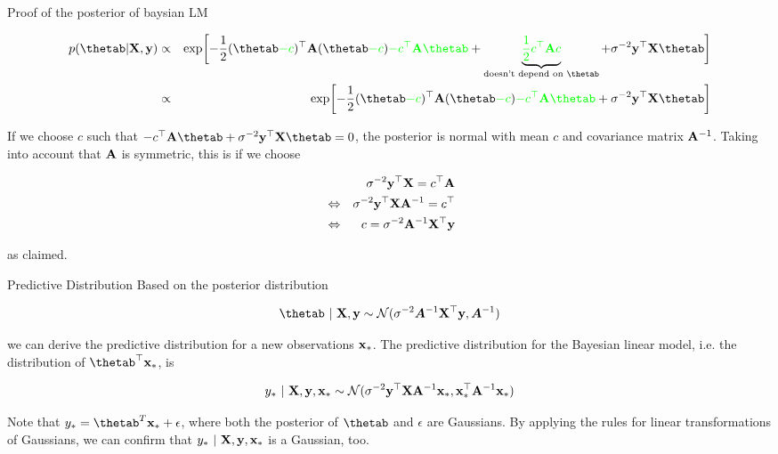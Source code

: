 \documentclass[11pt,compress,t,notes=noshow, xcolor=table]{beamer}
\begin{document}
\begin{vbframe}{Proof of the posterior of baysian LM}
\begin{footnotesize}
    \begin{eqnarray*}
    	p(\thetab | \Xmat, \yv) &\propto&  \exp\biggl[-\frac{1}{2}(\thetab \textcolor{green}{- c})^\top\Amat  (\thetab \textcolor{green}{- c}) \textcolor{green}{- c^\top \Amat \thetab} + \underbrace{\textcolor{green}{\frac{1}{2}c^\top\Amat c}}_{\text{doesn't depend on } \thetab} +\sigma^{-2} \yv^\top \Xmat \thetab\biggr] \\
    	&\propto& \exp\biggl[-\frac{1}{2}(\thetab \textcolor{green}{- c})^\top\Amat  (\thetab \textcolor{green}{- c}) \textcolor{green}{- c^\top \Amat \thetab} +\sigma^{-2} \yv^\top \Xmat \thetab\biggr]
    \end{eqnarray*}
    
    If we choose $c$ such that $- c^\top \Amat \thetab +\sigma^{-2} \yv^\top \Xmat \thetab = 0$, the posterior is normal with mean $c$ and covariance matrix $\mathbf{A}^{-1}$. Taking into account that $\mathbf{A}$ is symmetric, this is if we choose
    
    \begin{eqnarray*}
    && \sigma^{-2} \mathbf{y}^\top \mathbf{X} = c^\top\mathbf{A} \\
    &\Leftrightarrow & \sigma^{-2} \mathbf{y}^\top \mathbf{X} \mathbf{A}^{-1} = c^\top \\
    &\Leftrightarrow& c = \sigma^{-2} \mathbf{A}^{-1} \mathbf{X}^\top \mathbf{y}
    \end{eqnarray*}
    
    as claimed.
    
    \end{footnotesize}
\end{vbframe}

\begin{vbframe}{Predictive Distribution}
    Based on the posterior distribution 
    
    $$
    \thetab ~|~ \Xmat, \yv \sim \mathcal{N}(\sigma^{-2}\bm{A}^{-1}\Xmat^\top\yv, \bm{A}^{-1})
    $$
    
    we can derive the predictive distribution for a new observations $\mathbf{x}_*$. The predictive distribution for the Bayesian linear model, i.e. the distribution of $\thetab^\top \xv_*$, is 
    
    $$
    y_* ~|~ \mathbf{X}, \mathbf{y}, \mathbf{x}_* \sim \mathcal{N}(\sigma^{-2}\mathbf{y}^\top \mathbf{X} \mathbf{A}^{-1}\mathbf{x}_*, \mathbf{x}_*^\top\mathbf{A}^{-1}\mathbf{x}_*)
    $$

    Note that $y_* = \thetab^T \xv_* + \epsilon$, where both the posterior of $\thetab$ and $\epsilon$ are Gaussians. By applying the rules for linear transformations of Gaussians, we can confirm that $y_* ~|~ \mathbf{X}, \mathbf{y}, \mathbf{x}_*$ is a Gaussian, too. 
\end{vbframe}
\end{document}
